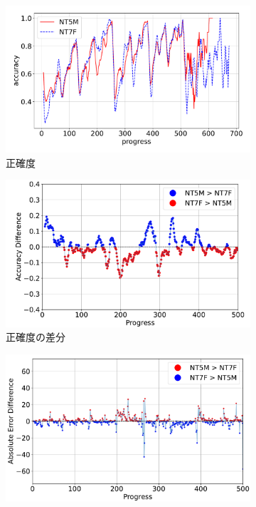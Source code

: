 \begin{figure}[t]
\centering
\begin{subfigure}[b]{0.49\linewidth}
    \includegraphics[width=\linewidth]{pdf/compare/EXP6_NT5M_and_NT7F/accuracy.pdf}
    \caption{正確度}
    \label{fig:EXP6_NT5M_and_NT7F_accuracy}
\end{subfigure}
\begin{subfigure}[b]{0.49\linewidth}
    \includegraphics[width=\linewidth]{pdf/compare/EXP6_NT5M_and_NT7F/acc_diff_plot.pdf}
    \caption{正確度の差分}
    \label{fig:EXP6_NT5M_and_NT7F_acc_diff}
\end{subfigure}
\begin{subfigure}[b]{0.49\linewidth}
    \includegraphics[width=\linewidth]{pdf/compare/EXP6_NT5M_and_NT7F/error_abs_diff_plot.pdf}

\end{subfigure}
\end{figure}

